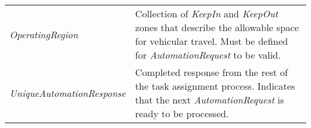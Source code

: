 \begin{longtable}[c]{@{}ll@{}}
\begin{minipage}[t]{0.29\columnwidth}
\emph{OperatingRegion}
\strut\end{minipage} &
\begin{minipage}[t]{0.65\columnwidth}\raggedright\strut
Collection of \emph{KeepIn} and \emph{KeepOut} zones that describe the
allowable space for vehicular travel. Must be defined for
\emph{AutomationRequest} to be valid.
\strut\end{minipage}\tabularnewline
\begin{minipage}[t]{0.29\columnwidth}\raggedright\strut
\emph{UniqueAutomationResponse}
\strut\end{minipage} &
\begin{minipage}[t]{0.65\columnwidth}\raggedright\strut
Completed response from the rest of the task assignment process.
Indicates that the next \emph{AutomationRequest} is ready to be
processed.
\strut\end{minipage}\tabularnewline
\bottomrule
\end{longtable}

